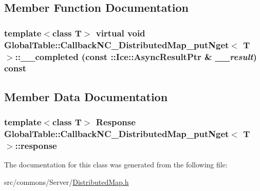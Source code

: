 \subsection{Member Function Documentation}
\hypertarget{class_global_table_1_1_callback_n_c___distributed_map__put_nget_aa2007f9896e573ab1a48c764719a7a42}{
\subsubsection[{\_\-\_\-completed}]{\setlength{\rightskip}{0pt plus 5cm}template$<$class T$>$ virtual void {\bf GlobalTable::CallbackNC\_\-DistributedMap\_\-putNget}$<$ T $>$::\_\-\_\-completed (const ::Ice::AsyncResultPtr \& {\em \_\-\_\-result}) const}}
\label{class_global_table_1_1_callback_n_c___distributed_map__put_nget_aa2007f9896e573ab1a48c764719a7a42}


\subsection{Member Data Documentation}
\hypertarget{class_global_table_1_1_callback_n_c___distributed_map__put_nget_ae94b50eca5cc3f931b57518ff0e277d9}{
\subsubsection[{response}]{\setlength{\rightskip}{0pt plus 5cm}template$<$class T$>$ {\bf Response} {\bf GlobalTable::CallbackNC\_\-DistributedMap\_\-putNget}$<$ T $>$::{\bf response}}}
\label{class_global_table_1_1_callback_n_c___distributed_map__put_nget_ae94b50eca5cc3f931b57518ff0e277d9}


The documentation for this class was generated from the following file:\begin{DoxyCompactItemize}
\item 
src/commons/Server/\hyperlink{_distributed_map_8h}{DistributedMap.h}\end{DoxyCompactItemize}
